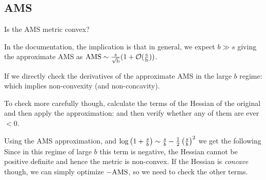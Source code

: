 
\begin{appendices}
\section{AMS}
\label{appendix:ams}
Is the AMS metric convex?

In the documentation, the implication is that in general, we expect $b \gg s$ giving the approximate AMS as $\rm{AMS} \sim \frac{s}{\sqrt{b}}(1+\mathcal{O}(\frac{s}{b}))$.

If we directly check the derivatives of the approximate AMS in the large $b$ regime:
which implies non-convexity (and non-concavity).

To check more carefully though, calculate the terms of the Hessian of the original and then apply the approximation:
and then verify whether any of them are ever $<0$.

Using the AMS approximation, and $\log\left(1+\frac{s}{b}\right) \sim \frac{s}{b} - \frac{1}{2}\left(\frac{s}{b}\right)^2$ we get the following
Since in this regime of large $b$ this term is negative, the Hessian cannot be positive definite and hence the metric is non-convex. If the Hessian is \emph{concave} though, we can simply optimize $-\rm{AMS}$, so we need to check the other terms.


\end{appendices}
